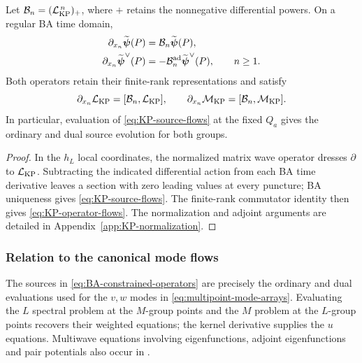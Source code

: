 \begin{proposition}
\label{prop:KP-hierarchy}
Let $\mathcal B_n=(\mathcal L_{\rm KP}^{\,n})_+$, where $+$ retains
the nonnegative differential powers. On a regular BA time domain,
\begin{equation}\label{eq:KP-source-flows}
\begin{aligned}
 \partial_{x_n}\widetilde{\boldsymbol\psi}(P)
   &=\mathcal B_n\widetilde{\boldsymbol\psi}(P),\\
 \partial_{x_n}\widetilde{\boldsymbol\psi}^{\vee}(P)
   &=-\mathcal B_n^{\rm ad}\widetilde{\boldsymbol\psi}^{\vee}(P),
 \qquad n\geq1.
\end{aligned}
\end{equation}
Both operators retain their finite-rank representations and satisfy
\begin{equation}\label{eq:KP-operator-flows}
 \partial_{x_n}\mathcal L_{\rm KP}
       =[\mathcal B_n,\mathcal L_{\rm KP}],\qquad
 \partial_{x_n}\mathcal M_{\rm KP}
       =[\mathcal B_n,\mathcal M_{\rm KP}].
\end{equation}
In particular, evaluation of \cref{eq:KP-source-flows} at the fixed
$Q_a$ gives the ordinary and dual source evolution for both groups.
\end{proposition}
\begin{proof}
In the $h_L$ local coordinates, the normalized matrix wave operator
dresses $\partial$ to $\mathcal L_{\rm KP}$. Subtracting the indicated
differential action from each BA time derivative leaves a section
with zero leading values at every puncture; BA uniqueness gives
\cref{eq:KP-source-flows}. The finite-rank commutator identity then
gives \cref{eq:KP-operator-flows}. The normalization and adjoint
arguments are detailed in Appendix~\ref{app:KP-normalization}.
\end{proof}

\subsubsection{Relation to the canonical mode flows}

The sources in \cref{eq:BA-constrained-operators} are precisely the
ordinary and dual evaluations used for the $v,w$ modes in
\cref{eq:multipoint-mode-arrays}. Evaluating the $L$ spectral problem
at the $M$-group points and the $M$ problem at the $L$-group points
recovers their weighted equations; the kernel derivative supplies
the $u$ equations. Multiwave equations involving eigenfunctions,
adjoint eigenfunctions and pair potentials also occur in
\cite[equations (57)--(58)]{AratynGomesNissimovPacheva2001}.

